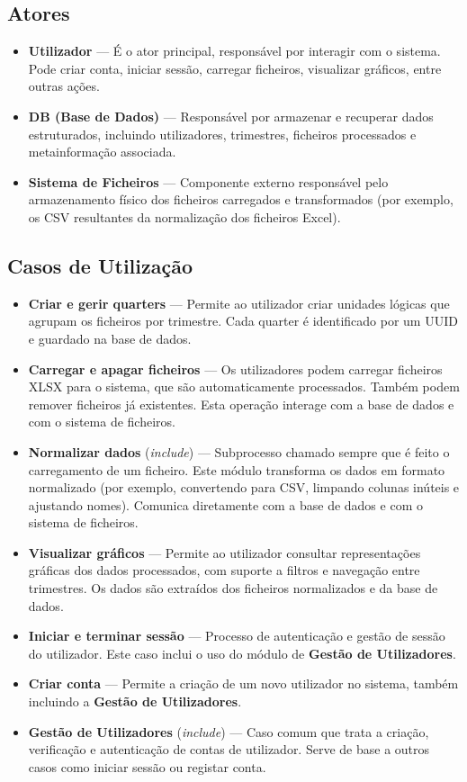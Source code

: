 \subsection*{Atores}
\begin{itemize}
    \item \textbf{Utilizador} — É o ator principal, responsável por interagir com o sistema. Pode criar conta, iniciar sessão, carregar ficheiros, visualizar gráficos, entre outras ações.
    \item \textbf{DB (Base de Dados)} — Responsável por armazenar e recuperar dados estruturados, incluindo utilizadores, trimestres, ficheiros processados e metainformação associada.
    \item \textbf{Sistema de Ficheiros} — Componente externo responsável pelo armazenamento físico dos ficheiros carregados e transformados (por exemplo, os CSV resultantes da normalização dos ficheiros Excel).
\end{itemize}

\subsection*{Casos de Utilização}
\begin{itemize}
    \item \textbf{Criar e gerir quarters} — Permite ao utilizador criar unidades lógicas que agrupam os ficheiros por trimestre. Cada quarter é identificado por um UUID e guardado na base de dados.
    \item \textbf{Carregar e apagar ficheiros} — Os utilizadores podem carregar ficheiros XLSX para o sistema, que são automaticamente processados. Também podem remover ficheiros já existentes. Esta operação interage com a base de dados e com o sistema de ficheiros.
    \item \textbf{Normalizar dados} (\textit{include}) — Subprocesso chamado sempre que é feito o carregamento de um ficheiro. Este módulo transforma os dados em formato normalizado (por exemplo, convertendo para CSV, limpando colunas inúteis e ajustando nomes). Comunica diretamente com a base de dados e com o sistema de ficheiros.
    \item \textbf{Visualizar gráficos} — Permite ao utilizador consultar representações gráficas dos dados processados, com suporte a filtros e navegação entre trimestres. Os dados são extraídos dos ficheiros normalizados e da base de dados.
    \item \textbf{Iniciar e terminar sessão} — Processo de autenticação e gestão de sessão do utilizador. Este caso inclui o uso do módulo de \textbf{Gestão de Utilizadores}.
    \item \textbf{Criar conta} — Permite a criação de um novo utilizador no sistema, também incluindo a \textbf{Gestão de Utilizadores}.
    \item \textbf{Gestão de Utilizadores} (\textit{include}) — Caso comum que trata a criação, verificação e autenticação de contas de utilizador. Serve de base a outros casos como iniciar sessão ou registar conta.
\end{itemize}

